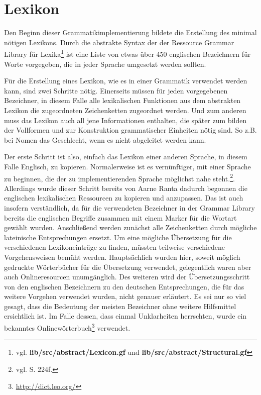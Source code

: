 \documentclass[fontsize=12pt,abstract=on,titlepage,bibliography=totoc,ngerman,listof=totoc]{scrreprt}
\begin{document}
\section{Lexikon}
\label{sec:lexikon}
Den Beginn dieser Grammatikimplementierung bildete die Erstellung des minimal nötigen Lexikons. Durch die abstrakte Syntax der der Ressource Grammar Library für Lexika\footnote{vgl. \textbf{lib/src/abstract/Lexicon.gf} und \textbf{lib/src/abstract/Structural.gf}} ist eine Liste von etwas über 450 englischen Bezeichnern für Worte vorgegeben, die in jeder Sprache umgesetzt werden sollten. \par
Für die Erstellung eines Lexikon, wie es in einer Grammatik verwendet werden kann, sind zwei Schritte nötig. Einerseits müssen für jeden vorgegebenen Bezeichner, in diesem Falle alle lexikalischen Funktionen aus dem abstrakten Lexikon die zugeordneten Zeichenketten zugeordnet werden. Und zum anderen muss das Lexikon auch all jene Informationen enthalten, die später zum bilden der Vollformen und zur Konstruktion grammatischer Einheiten nötig sind. So z.B. bei Nomen das Geschlecht, wenn es nicht abgeleitet werden kann. \par
Der erste Schritt ist also, einfach das Lexikon einer anderen Sprache, in diesem Falle Englisch, zu kopieren. Normalerweise ist es vernünftiger, mit einer Sprache zu beginnen, die der zu implementierenden Sprache möglichst nahe steht.\footnote{vgl. \cite{RANTA2011} S. 224f.}. Allerdings wurde dieser Schritt bereits von Aarne Ranta dadurch begonnen die englischen lexikalischen Ressourcen zu kopieren und anzupassen. Das ist auch insofern verständlich, da für die verwendeten Bezeichner in der Grammar Library bereits die englischen Begriffe zusammen mit einem Marker für die Wortart gewählt wurden. Anschließend werden zunächst alle Zeichenketten durch mögliche lateinische Entsprechungen ersetzt. Um eine mögliche Übersetzung für die verschiedenen Lexikoneinträge zu finden, müssten teilweise verschiedene Vorgehensweisen bemüht werden. Hauptsächlich wurden hier, soweit möglich gedruckte Wörterbücher für die Übersetzung verwendet, gelegentlich waren aber auch Onlineresourcen unumgänglich. Des weiteren wird der Übersetzungsschritt von den englischen Bezeichnern zu den deutschen Entsprechungen, die für das weitere Vorgehen verwendet wurden, nicht genauer erläutert. Es sei nur so viel gesagt, dass die Bedeutung der meisten Bezeichner ohne weitere Hilfsmittel ersichtlich ist. Im Falle dessen, dass einmal Unklarheiten herrschten, wurde ein bekanntes Onlinewörterbuch\footnote{\url{http://dict.leo.org/}} verwendet.\par
\end{document}
